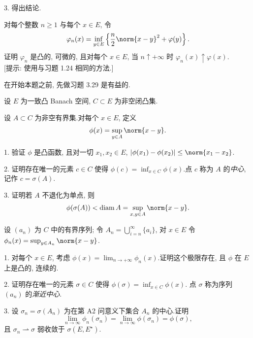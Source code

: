 \begin{problem}[第 1, 3 章]
3. 得出结论.


对每个整数 $n\ge1$ 与每个 $x\in E$, 令
\begin{equation*}
\varphi_n(x)=\inf_{y\in E}\left\{\frac n2\norm{x-y}^2+\varphi(y)\right\}.
\end{equation*}
证明 $\varphi_n$ 是凸的, 可微的, 且对每个 $x\in E$, 当 $n\uparrow+\infty$ 时
$\varphi_n(x)\uparrow\varphi(x)$.\\
{[提示: 使用与习题 1.24 相同的方法.]}
\end{problem}

\begin{problem}
\label{prob:15}
在开始本题之前, 先做习题 3.29 是有益的.

设 $E$ 为一致凸 Banach 空间, $C\subset E$ 为非空闭凸集.


设 $A\subset C$ 为非空有界集.对每个 $x\in E$, 定义
\begin{equation*}
\phi(x)=\sup_{y\in A}\norm{x-y}.
\end{equation*}

1. 验证 $\phi$ 是凸函数, 且对一切 $x_1,x_2\in E$,
$\abs{\phi(x_1)-\phi(x_2)}\le\norm{x_1-x_2}$.

2. 证明存在唯一的元素 $c\in C$ 使得 $\phi(c)=\inf_{x\in C}\phi(x)$.点 $c$
称为 $A$ 的\emph{中心}, 记作 $c=\sigma(A)$.

3. 证明若 $A$ 不退化为单点, 则
\begin{equation*}
\phi(\sigma(A))<\operatorname{diam}A=\sup_{x,y\in A}\norm{x-y}.
\end{equation*}


设 $(a_n)$ 为 $C$ 中的有界序列; 令 $A_n=\bigcup_{i=n}^\infty\{a_i\}$,
对 $x\in E$ 令 $\phi_n(x)=\sup_{y\in A_n}\norm{x-y}$.

1. 对每个 $x\in E$, 考虑 $\phi(x)=\lim_{n\to+\infty}\phi_n(x)$.证明这个极限存在,
且 $\phi$ 在 $E$ 上是凸的, 连续的.

2. 证明存在唯一的元素 $\sigma\in C$ 使得 $\phi(\sigma)=\inf_{x\in C}\phi(x)$.
点 $\sigma$ 称为序列 $(a_n)$ 的\emph{渐近中心}.

3. 设 $\sigma_n=\sigma(A_n)$ 为在第 A2 问意义下集合 $A_n$ 的中心.证明
\begin{equation*}
\lim_{n\to\infty}\phi_n(\sigma_n)=\lim_{n\to\infty}\phi(\sigma_n)=\phi(\sigma),
\end{equation*}
且 $\sigma_n\rightharpoonup\sigma$ 弱收敛于 $\sigma(E,E^\star)$.


\end{problem}
